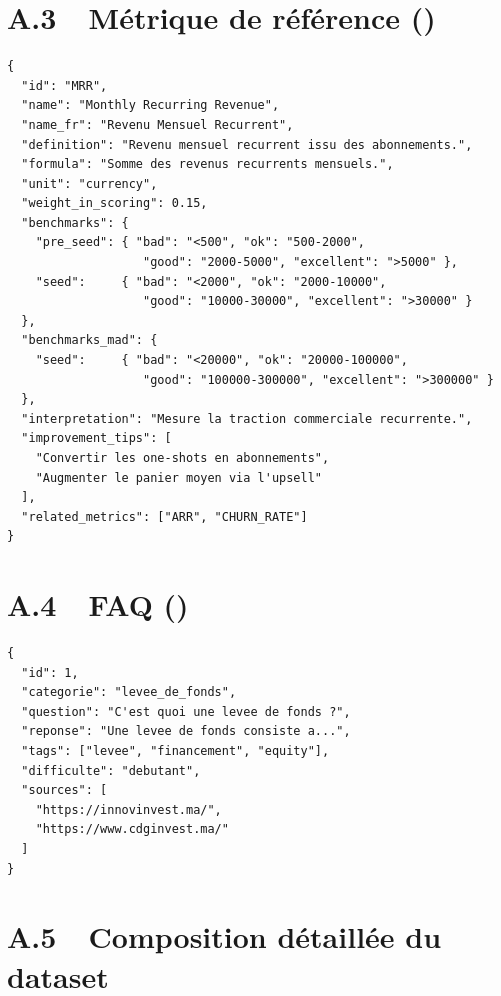 \section*{A.3~~Métrique de référence ()}

\begin{lstlisting}[caption={Schéma d'une métrique de référence.}]
{
  "id": "MRR",
  "name": "Monthly Recurring Revenue",
  "name_fr": "Revenu Mensuel Recurrent",
  "definition": "Revenu mensuel recurrent issu des abonnements.",
  "formula": "Somme des revenus recurrents mensuels.",
  "unit": "currency",
  "weight_in_scoring": 0.15,
  "benchmarks": {
    "pre_seed": { "bad": "<500", "ok": "500-2000",
                   "good": "2000-5000", "excellent": ">5000" },
    "seed":     { "bad": "<2000", "ok": "2000-10000",
                   "good": "10000-30000", "excellent": ">30000" }
  },
  "benchmarks_mad": {
    "seed":     { "bad": "<20000", "ok": "20000-100000",
                   "good": "100000-300000", "excellent": ">300000" }
  },
  "interpretation": "Mesure la traction commerciale recurrente.",
  "improvement_tips": [
    "Convertir les one-shots en abonnements",
    "Augmenter le panier moyen via l'upsell"
  ],
  "related_metrics": ["ARR", "CHURN_RATE"]
}
\end{lstlisting}

\section*{A.4~~FAQ ()}

\begin{lstlisting}[caption={Schéma d'une FAQ.}]
{
  "id": 1,
  "categorie": "levee_de_fonds",
  "question": "C'est quoi une levee de fonds ?",
  "reponse": "Une levee de fonds consiste a...",
  "tags": ["levee", "financement", "equity"],
  "difficulte": "debutant",
  "sources": [
    "https://innovinvest.ma/",
    "https://www.cdginvest.ma/"
  ]
}
\end{lstlisting}

\section*{A.5~~Composition détaillée du dataset}

